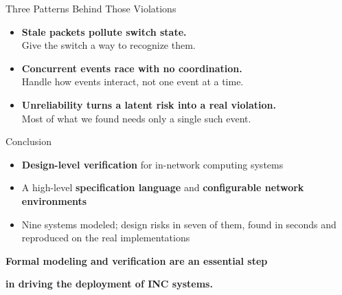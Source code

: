 \begin{frame}{Three Patterns Behind Those Violations}
  \vspace{0.6em}
  \begin{itemize}
    \item \textbf{Stale packets pollute switch state.}\\
          {Give the switch a way to recognize them.}
    \vspace{0.8em}
    \item \textbf{Concurrent events race with no coordination.}\\
          {Handle how events interact, not one event at a time.}
    \vspace{0.8em}
    \item \textbf{Unreliability turns a latent risk into a real violation.}\\
          {Most of what we found needs only a single such event.}
  \end{itemize}
\end{frame}

\begin{frame}{Conclusion}
  \vspace{0.6em}
  \begin{itemize}
    \setlength{\itemsep}{0.9em}
    \item \textbf{Design-level verification} for in-network computing systems
    \item A high-level \textbf{specification language} and
          \textbf{configurable network environments}
    \item Nine systems modeled; design risks in seven of them, found in
          seconds and reproduced on the real implementations
  \end{itemize}
  \vspace{1.0em}
  \begin{center}
    \begin{minipage}{0.94\textwidth}
      \centering
      \alert{\textbf{Formal modeling and verification are an essential step}}\par
      \alert{\textbf{in driving the deployment of INC systems.}}
    \end{minipage}
  \end{center}
\end{frame}
